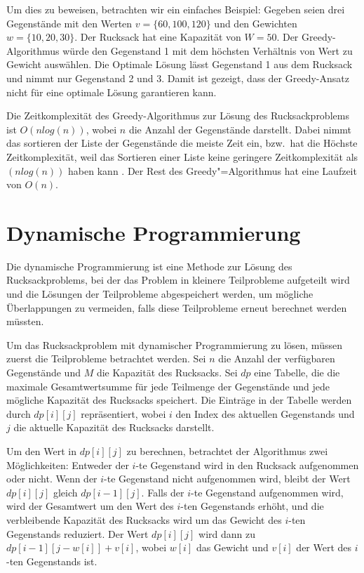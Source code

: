 Um dies zu beweisen, betrachten wir ein einfaches Beispiel: 
Gegeben seien drei Gegenstände mit den Werten $v = \{60, 100, 120\}$ 
und den Gewichten $w =\{10, 20, 30\}$. Der Rucksack hat eine Kapazität 
von $W = 50$. Der Greedy-Algorithmus würde den Gegenstand 1 mit 
dem höchsten Verhältnis von Wert zu Gewicht auswählen. Die Optimale 
Lösung lässt Gegenstand 1 aus dem Rucksack und nimmt nur Gegenstand 2 und 3.
Damit ist gezeigt, dass der Greedy-Ansatz nicht für eine optimale Lösung 
garantieren kann.

Die Zeitkomplexität des Greedy-Algorithmus zur Lösung des 
Rucksackproblems ist $O(nlog(n))$, 
wobei $n$ die Anzahl der Gegenstände darstellt. Dabei nimmt das 
sortieren der Liste der Gegenstände die meiste Zeit ein, bzw.\ hat 
die Höchste Zeitkomplexität, weil das Sortieren einer Liste 
keine geringere Zeitkomplexität als $(nlog(n))$ haben kann 
. Der Rest des Greedy"=Algorithmus hat eine 
Laufzeit von $O(n)$.\ \cite[vgl.]{cormen2022introduction}

\section{Dynamische Programmierung}
Die dynamische Programmierung ist eine Methode zur 
Lösung des Rucksackproblems, bei der das Problem in kleinere 
Teilprobleme aufgeteilt wird und die Lösungen der Teilprobleme 
abgespeichert werden, um mögliche Überlappungen zu vermeiden, falls 
diese Teilprobleme erneut berechnet werden müssten.

Um das Rucksackproblem mit dynamischer Programmierung zu 
lösen, müssen zuerst die Teilprobleme betrachtet werden. Sei $n$ die 
Anzahl der verfügbaren Gegenstände und $M$ die Kapazität des 
Rucksacks. Sei $dp$ eine Tabelle, die die maximale 
Gesamtwertsumme für jede Teilmenge der Gegenstände und jede 
mögliche Kapazität des Rucksacks speichert. Die Einträge in 
der Tabelle werden durch $dp[i][j]$ repräsentiert, wobei $i$ den 
Index des aktuellen Gegenstands und $j$ die aktuelle Kapazität 
des Rucksacks darstellt.

Um den Wert in $dp[i][j]$ zu berechnen, betrachtet der Algorithmus 
zwei Möglichkeiten: Entweder der $i$-te Gegenstand wird in den 
Rucksack aufgenommen oder nicht. Wenn der $i$-te Gegenstand 
nicht aufgenommen wird, bleibt der Wert $dp[i][j]$ gleich 
$dp[i-1][j]$. Falls der $i$-te Gegenstand aufgenommen wird, wird 
der Gesamtwert um den Wert des $i$-ten Gegenstands erhöht, und 
die verbleibende Kapazität des Rucksacks wird um das Gewicht 
des $i$-ten Gegenstands reduziert. Der Wert $dp[i][j]$ wird dann 
zu $dp[i-1][j-w[i]] + v[i]$, wobei $w[i]$ das Gewicht und $v[i]$ 
der Wert des $i$-ten Gegenstands ist.

